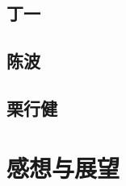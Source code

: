 \documentclass[UTF8]{ctexart}
\begin{document}
\subsection{丁一}
\subsection{陈波}
\subsection{栗行健}

\section{感想与展望}
\end{document}
